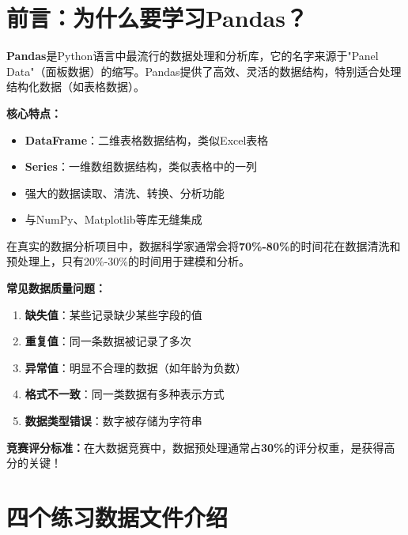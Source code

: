 \documentclass[12pt,a4paper]{article}
\begin{document}
\tableofcontents
\newpage

\section{前言：为什么要学习Pandas？}

\begin{theorybox}[什么是Pandas？]
\textbf{Pandas}是Python语言中最流行的数据处理和分析库，它的名字来源于"Panel Data"（面板数据）的缩写。Pandas提供了高效、灵活的数据结构，特别适合处理结构化数据（如表格数据）。

\textbf{核心特点：}
\begin{itemize}
    \item \textbf{DataFrame}：二维表格数据结构，类似Excel表格
    \item \textbf{Series}：一维数组数据结构，类似表格中的一列
    \item 强大的数据读取、清洗、转换、分析功能
    \item 与NumPy、Matplotlib等库无缝集成
\end{itemize}
\end{theorybox}

\begin{theorybox}[为什么数据处理很重要？]
在真实的数据分析项目中，数据科学家通常会将\textbf{70\%-80\%}的时间花在数据清洗和预处理上，只有20\%-30\%的时间用于建模和分析。

\textbf{常见数据质量问题：}
\begin{enumerate}
    \item \textbf{缺失值}：某些记录缺少某些字段的值
    \item \textbf{重复值}：同一条数据被记录了多次
    \item \textbf{异常值}：明显不合理的数据（如年龄为负数）
    \item \textbf{格式不一致}：同一类数据有多种表示方式
    \item \textbf{数据类型错误}：数字被存储为字符串
\end{enumerate}

\textbf{竞赛评分标准：}在大数据竞赛中，数据预处理通常占\textbf{30\%}的评分权重，是获得高分的关键！
\end{theorybox}

\section{四个练习数据文件介绍}
\end{document}
